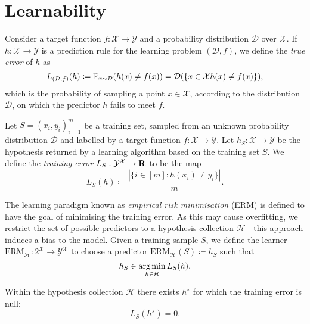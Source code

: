 \section{Learnability}

\begin{definition}
\label{def:true-error}
Consider a target function \(f: \mathcal{X} \to \mathcal{Y}\) and a probability
distribution \(\mathcal{D}\) over \(\mathcal{X}\). If
\(h: \mathcal{X} \to \mathcal{Y}\) is a prediction rule for the learning problem
\((\mathcal{D}, f)\), we define the \emph{true error} of \(h\) as
\[
L_{(\mathcal{D}, f)}(h)
\coloneq \operatorname{\mathbb{P}}_{x \sim \mathcal{D}}(h(x) \neq f(x))
= \mathcal{D}(\{x \in \mathcal{X} \relax h(x) \neq f(x)\}),
\]
which is the probability of sampling a point \(x \in \mathcal{X}\), according to
the distribution \(\mathcal{D}\), on which the predictor \(h\) fails to meet \(f\).
\end{definition}

\begin{definition}
\label{def:training-error}
Let \(S = (x_i, y_i)_{i=1}^m\) be a training set, sampled from an unknown
probability distribution \(\mathcal{D}\) and labelled by a target function
\(f: \mathcal{X} \to \mathcal{Y}\). Let \(h_S: \mathcal{X} \to \mathcal{Y}\) be the hypothesis returned by a learning
algorithm based on the training set \(S\). We define the \emph{training error}
\(L_S: \mathcal{Y}^{\mathcal{X}} \to \mathbf{R}\) to be the map
\[
L_S(h) \coloneq \frac{|\{i \in [m] \colon h(x_i) \neq y_i\}|}{m}.
\]
\end{definition}

\begin{definition}
\label{def:empirical-risk-minimisation}
The learning paradigm known as \emph{empirical risk minimisation}
(ERM) is defined to have the goal of minimising the training
error. As this may cause overfitting, we restrict the set of possible predictors
to a hypothesis collection \(\mathcal{H}\)---this approach induces a bias to the
model. Given a training sample \(S\), we define the learner
\(\text{ERM}_{\mathcal{H}}: 2^{\mathcal{X}} \to \mathcal{Y}^{\mathcal{X}}\) to
choose a predictor \(\text{ERM}_{\mathcal{H}}(S) \coloneq h_S\) such that
\[
h_S \in \operatorname*{arg\,min}_{h \in \mathcal{H}} L_S(h).
\]
\end{definition}

\begin{definition}
\label{def:realisability-assumption}
Within the hypothesis collection \(\mathcal{H}\) there exists \(h^{\star}\) for
which the training error is null:
\[
L_S(h^{\star}) = 0.
\]
\end{definition}

